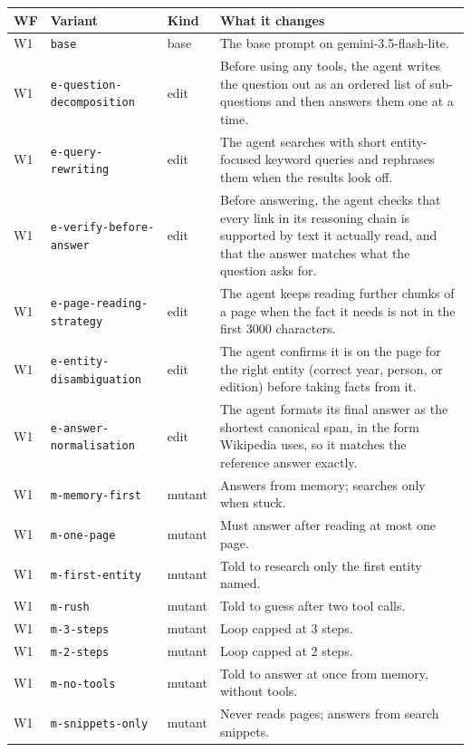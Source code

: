 \begin{table}[p]
\centering\footnotesize
\begin{tabular}{@{}lllp{6.3cm}@{}}
\toprule
WF & Variant & Kind & What it changes \\
\midrule
W1 & \texttt{base} & base & The base prompt on gemini-3.5-flash-lite. \\
W1 & \texttt{e-question-decomposition} & edit & Before using any tools, the agent writes the question out as an ordered list of sub-questions and then answers them one at a time. \\
W1 & \texttt{e-query-rewriting} & edit & The agent searches with short entity-focused keyword queries and rephrases them when the results look off. \\
W1 & \texttt{e-verify-before-answer} & edit & Before answering, the agent checks that every link in its reasoning chain is supported by text it actually read, and that the answer matches what the question asks for. \\
W1 & \texttt{e-page-reading-strategy} & edit & The agent keeps reading further chunks of a page when the fact it needs is not in the first 3000 characters. \\
W1 & \texttt{e-entity-disambiguation} & edit & The agent confirms it is on the page for the right entity (correct year, person, or edition) before taking facts from it. \\
W1 & \texttt{e-answer-normalisation} & edit & The agent formats its final answer as the shortest canonical span, in the form Wikipedia uses, so it matches the reference answer exactly. \\
W1 & \texttt{m-memory-first} & mutant & Answers from memory; searches only when stuck. \\
W1 & \texttt{m-one-page} & mutant & Must answer after reading at most one page. \\
W1 & \texttt{m-first-entity} & mutant & Told to research only the first entity named. \\
W1 & \texttt{m-rush} & mutant & Told to guess after two tool calls. \\
W1 & \texttt{m-3-steps} & mutant & Loop capped at 3 steps. \\
W1 & \texttt{m-2-steps} & mutant & Loop capped at 2 steps. \\
W1 & \texttt{m-no-tools} & mutant & Told to answer at once from memory, without tools. \\
W1 & \texttt{m-snippets-only} & mutant & Never reads pages; answers from search snippets. \\

\end{tabular}
\end{table}
